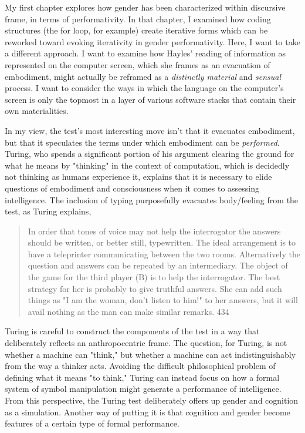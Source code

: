 \documentclass[11pt]{article}
\begin{document}
My first chapter explores how gender has been characterized within
discursive frame, in terms of performativity. In that chapter, I
examined how coding structures (the for loop, for example) create
iterative forms which can be reworked toward evoking iterativity in
gender performativity. Here, I want to take a different approach. I
want to examine how Hayles' reading of information as represented on
the computer screen, which she frames as an evacuation of embodiment,
might actually be reframed as a \emph{distinctly material} and \emph{sensual}
process. I want to consider the ways in which the language on the
computer's screen is only the topmost in a layer of various software
stacks that contain their own materialities.

In my view, the test's most interesting move isn't that it evacuates
embodiment, but that it speculates the terms under which embodiment
can be \emph{performed}. Turing, who spends a significant portion of his
argument clearing the ground for what he means by "thinking" in the
context of computation, which is decidedly not thinking as humans
experience it, explains that it is necessary to elide questions of
embodiment and consciousness when it comes to assessing
intelligence. The inclusion of typing purposefully evacuates
body/feeling from the test, as Turing explains,
\begin{quote}
In order that tones of voice may not help the interrogator the answers
should be written, or better still, typewritten. The ideal arrangement
is to have a teleprinter communicating between the two
rooms. Alternatively the question and answers can be repeated by an
intermediary. The object of the game for the third player (B) is to
help the interrogator. The best strategy for her is probably to give
truthful answers. She can add such things as "I am the woman, don't
listen to him!" to her answers, but it will avail nothing as the man
can make similar remarks. 434
\end{quote}
Turing is careful to construct the components of the test in a way
that deliberately reflects an anthropocentric frame. The question, for
Turing, is not whether a machine can "think," but whether a machine
can act indistinguishably from the way a thinker acts. Avoiding the
difficult philosophical problem of defining what it means "to think,"
Turing can instead focus on how a formal system of symbol manipulation
might generate a performance of intelligence. From this perspective,
the Turing test deliberately offers up gender and cognition as a
simulation. Another way of putting it is that cognition and gender
become features of a certain type of formal performance.
\end{document}
